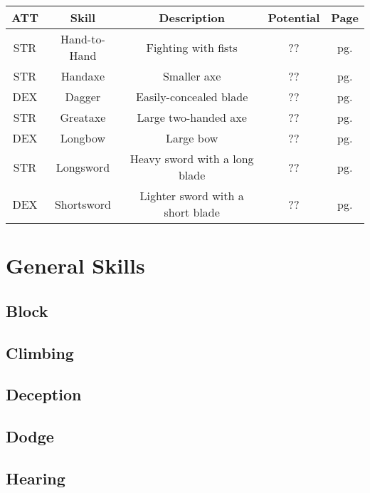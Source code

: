 \begin{table}[h!]
    \begin{tabular}{|c|c|c|c|c|}
        \hline
        ATT & Skill & Description & Potential & Page \\
        \hline
        STR & Hand-to-Hand & Fighting with fists & ?? & pg. \pageref{skill:hand-to-hand} \\
        STR & Handaxe & Smaller axe & ?? & pg. \pageref{skill:handaxe} \\
        DEX & Dagger & Easily-concealed blade & ?? & pg. \pageref{skill:dagger} \\
        STR & Greataxe & Large two-handed axe & ?? & pg. \pageref{skill:greataxe} \\
        DEX & Longbow & Large bow & ?? & pg. \pageref{skill:longbow} \\
        STR & Longsword & Heavy sword with a long blade & ?? & pg. \pageref{skill:longsword} \\
        DEX & Shortsword & Lighter sword with a short blade & ?? & pg. \pageref{skill:shortsword} \\
        \hline
    \end{tabular}
    \label{tab:weapon-skills}
\end{table}

\section{General Skills}

\subsection{Block}\label{skill:block}

\subsection{Climbing}\label{skill:climbing}

\subsection{Deception}\label{skill:deception}

\subsection{Dodge}\label{skill:dodge}

\subsection{Hearing}\label{skill:hearing}

